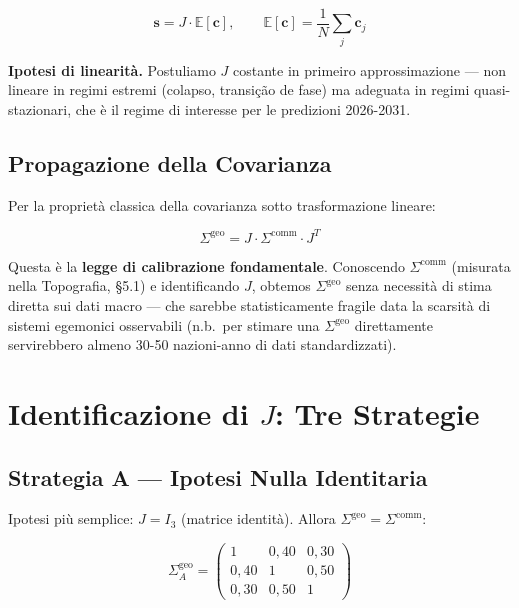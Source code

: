 \[
\mathbf{s} = J \cdot \mathbb{E}[\mathbf{c}], \qquad \mathbb{E}[\mathbf{c}] = \frac{1}{N}\sum_j \mathbf{c}_j
\]

\Hypoth{} \textbf{Ipotesi di linearità.} Postuliamo \(J\) costante in
primeiro approssimazione --- non lineare in regimi estremi (colapso,
transição de fase) ma adeguata in regimi quasi-stazionari, che è il
regime di interesse per le predizioni 2026-2031.

\subsection{Propagazione della
Covarianza}\label{propagazione-della-covarianza}

Per la proprietà classica della covarianza sotto trasformazione lineare:

\[
\boxed{\Sigma^{\text{geo}} = J \cdot \Sigma^{\text{comm}} \cdot J^T}
\]

Questa è la \textbf{legge di calibrazione fondamentale}. Conoscendo
\(\Sigma^{\text{comm}}\) (misurata nella Topografia, \S{}5.1) e
identificando \(J\), obtemos \(\Sigma^{\text{geo}}\) senza necessità
di stima diretta sui dati macro --- che sarebbe statisticamente fragile
data la scarsità di sistemi egemonici osservabili (n.b.~per stimare una
\(\Sigma^{\text{geo}}\) direttamente servirebbero almeno 30-50
nazioni-anno di dati standardizzati).



\section{\texorpdfstring{Identificazione di \(J\): Tre
Strategie}{Identificazione di J: Tre Strategie}}\label{identificazione-di-j-tre-strategie}

\subsection{Strategia A --- Ipotesi Nulla
Identitaria}\label{strategia-a-hipótese-nulla-identitaria}

Ipotesi più semplice: \(J = I_3\) (matrice identità). Allora
\(\Sigma^{\text{geo}} = \Sigma^{\text{comm}}\):

\[
\Sigma^{\text{geo}}_A = \begin{pmatrix} 1 & 0{,}40 & 0{,}30 \\ 0{,}40 & 1 & 0{,}50 \\ 0{,}30 & 0{,}50 & 1 \end{pmatrix}
\]

